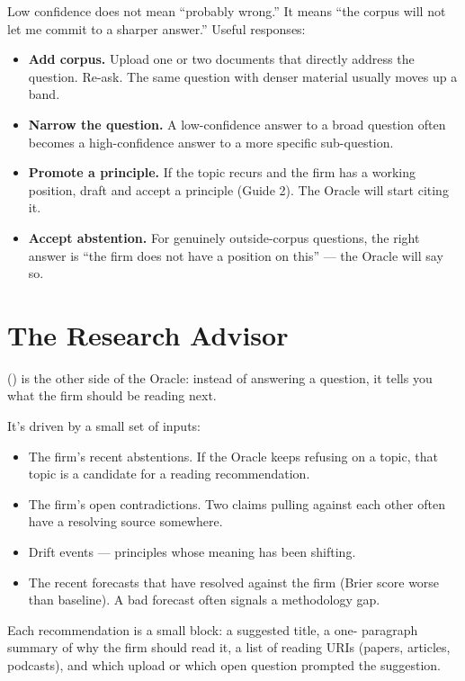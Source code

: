 \documentclass[11pt]{article}
\begin{document}
Low confidence does not mean ``probably wrong.'' It means ``the corpus
will not let me commit to a sharper answer.'' Useful responses:

\begin{itemize}[leftmargin=*,itemsep=0.2em]
  \item \textbf{Add corpus.} Upload one or two documents that directly
        address the question. Re-ask. The same question with denser
        material usually moves up a band.
  \item \textbf{Narrow the question.} A low-confidence answer to a
        broad question often becomes a high-confidence answer to a
        more specific sub-question.
  \item \textbf{Promote a principle.} If the topic recurs and the
        firm has a working position, draft and accept a principle
        (Guide 2). The Oracle will start citing it.
  \item \textbf{Accept abstention.} For genuinely outside-corpus
        questions, the right answer is ``the firm does not have a
        position on this'' --- the Oracle will say so.
\end{itemize}

\section{The Research Advisor}

 () is the other side of the Oracle:
instead of answering a question, it tells you what the firm should be
reading next.

It's driven by a small set of inputs:

\begin{itemize}[leftmargin=*,itemsep=0.2em]
  \item The firm's recent abstentions. If the Oracle keeps refusing
        on a topic, that topic is a candidate for a reading
        recommendation.
  \item The firm's open contradictions. Two claims pulling against
        each other often have a resolving source somewhere.
  \item Drift events --- principles whose meaning has been shifting.
  \item The recent forecasts that have resolved against the firm
        (Brier score worse than baseline). A bad forecast often
        signals a methodology gap.
\end{itemize}

Each recommendation is a small block: a suggested title, a one-
paragraph summary of why the firm should read it, a list of reading
URIs (papers, articles, podcasts), and which upload or which open
question prompted the suggestion.
\end{document}
